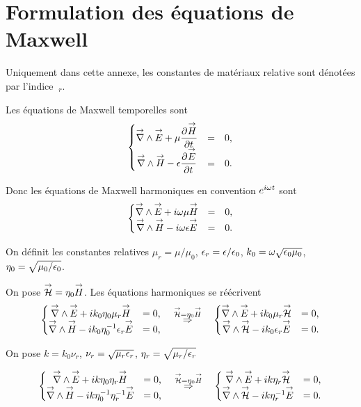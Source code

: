 \section{Formulation des équations de Maxwell}
\label{sec:annex:maxwell_equation}

Uniquement dans cette annexe, les constantes de matériaux relative sont dénotées par l'indice \(~_r\).

Les équations de Maxwell temporelles sont
\begin{equation}
  \left\lbrace \begin{matrix}
  \vrot \vE + \mu \ddr{t}{\vect{H}} &=& 0,
  \\
  \vrot \vect{H} - \eps \ddr{t}{\vE} &=& 0.
  \end{matrix} \right.
\end{equation}

Donc les équations de Maxwell harmoniques en convention \(e^{i\w t}\) sont
\begin{equation}
  \left\lbrace \begin{matrix}
  \vrot \vE + i\w\mu \vect{H} &=& 0,
  \\
  \vrot \vect{H} - i\w\eps \vE &=& 0.
  \end{matrix} \right.
\end{equation}

On définit les constantes relatives \(\mu_r = \mu \slash \mu_0\), \(\eps_r = \eps \slash \eps_0\), \(k_0 = \w \sqrt {\eps_0\mu_0}\), \(\eta_0=\sqrt {\mu_0/\eps_0}\).

On pose \(\vH = \eta_0 \vect{H}\).
Les équations harmoniques se réécrivent
\begin{equation}
\left\lbrace \begin{matrix}
\vrot \vE + ik_0\eta_0\mu_r \vect{H} &= 0,
\\
\vrot \vect{H} - ik_0\eta_0^{-1}\eps_r \vE &= 0,
\end{matrix} \right.
\quad
\overset{\vH = \eta_0 \vect{H}}{\Rightarrow}
\quad
\left\lbrace \begin{matrix}
\vrot \vE + ik_0\mu_r \vH &= 0,
\\
\vrot \vH - ik_0\eps_r \vE &= 0.
\end{matrix} \right.
\end{equation}

On pose \(k=k_0\nu_r\), \(\nu_r = \sqrt{\mu_r\eps_r}\), \(\eta_r = \sqrt{\mu_r \slash \eps_r}\)

\begin{equation}
\left\lbrace \begin{matrix}
\vrot \vE + ik\eta_0\eta_r \vect{H} &= 0,
\\
\vrot \vect{H} - ik\eta_0^{-1}\eta_r^{-1} \vE &= 0,
\end{matrix} \right.
\quad
\overset{\vH = \eta_0 \vect{H}}{\Rightarrow}
\quad
\left\lbrace \begin{matrix}
\vrot \vE + ik\eta_r \vH &= 0,
\\
\vrot \vH - ik\eta_r^{-1} \vE &= 0.
\end{matrix} \right.
\end{equation}